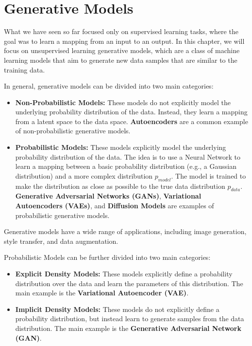 \section{Generative Models}
What we have seen so far focused only on supervised learning tasks, where the goal was to learn a mapping from an input to an output. 
In this chapter, we will focus on unsupervised learning generative models, which are a class of machine learning models that aim to generate new data samples that are similar to the training data. 

In general, generative models can be divided into two main categories:
\begin{itemize}
    \item \textbf{Non-Probabilistic Models:} These models do not explicitly model the underlying probability distribution of the data. 
    Instead, they learn a mapping from a latent space to the data space. \textbf{Autoencoders} are a common example of non-probabilistic generative models.
    \item \textbf{Probabilistic Models:} These models explicitly model the underlying probability distribution of the data.
    The idea is to use a Neural Network to learn a mapping between a basic probability distribution (e.g., a Gaussian distribution) and a more complex distribution $p_{model}$.
    The model is trained to make the distribution as close as possible to the true data distribution $p_{data}$.
    \textbf{Generative Adversarial Networks (GANs)}, \textbf{Variational Autoencoders (VAEs)}, and \textbf{Diffusion Models} are examples of probabilistic generative models.
\end{itemize}

Generative models have a wide range of applications, including image generation, style transfer, and data augmentation.


Probabilistic Models can be further divided into two main categories:
\begin{itemize}
    \item \textbf{Explicit Density Models:} These models explicitly define a probability distribution over the data and learn the parameters of this distribution. 
    The main example is the \textbf{Variational Autoencoder (VAE)}.
    
    \item \textbf{Implicit Density Models:} These models do not explicitly define a probability distribution, but instead learn to generate samples from the data distribution.
    The main example is the \textbf{Generative Adversarial Network (GAN)}.
\end{itemize}

